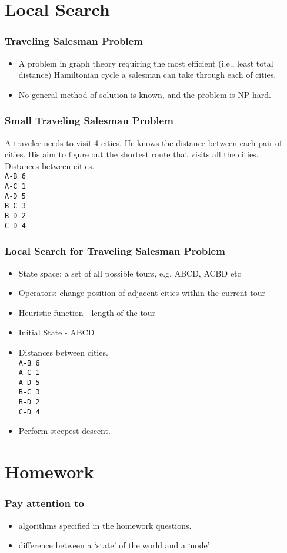\documentclass[compress, 9pt]{beamer}
\begin{document}
\section{Local Search}
\label{sec-2}
\begin{frame}
\frametitle{Traveling Salesman Problem}
\label{sec-2-1}
\begin{itemize}

\item A problem in graph theory requiring the most efficient (i.e., least total distance) Hamiltonian cycle a salesman can take through each of  cities.
\label{sec-2-1-1}%

\item <2-> No general method of solution is known, and the problem is NP-hard.
\label{sec-2-1-2}%
\end{itemize} %
\end{frame}
\begin{frame}
\frametitle{Small Traveling Salesman Problem}
\label{sec-2-2}

A traveler needs to visit 4 cities. He knows the distance between each
pair of cities. His aim to figure out the shortest route that visits
all the cities.  \\
Distances between cities. \\
\texttt{A-B 6}\\
\texttt{A-C 1}\\
\texttt{A-D 5}\\
\texttt{B-C 3}\\
\texttt{B-D 2}\\
\texttt{C-D 4}\\
\end{frame}
\begin{frame}
\frametitle{Local Search for Traveling Salesman Problem}
\label{sec-2-3}

\begin{itemize}
\item State space: a set of all possible tours, e.g. ABCD, ACBD etc
\item Operators: change position of adjacent cities within the current tour
\item Heuristic function - length of the tour
\item Initial State - ABCD
\item Distances between cities. \\
\texttt{A-B 6}\\
   \texttt{A-C 1}\\
   \texttt{A-D 5}\\
   \texttt{B-C 3}\\
   \texttt{B-D 2}\\
   \texttt{C-D 4}\\
\item Perform steepest descent.
\end{itemize}
\end{frame}
\section{Homework}
\label{sec-3}
\begin{frame}
\frametitle{Pay attention to}
\label{sec-3-1}

\begin{itemize}
\item algorithms specified in the homework questions.
\item difference between a `state' of the world and a `node'
\end{itemize}
\end{frame}
\end{document}
